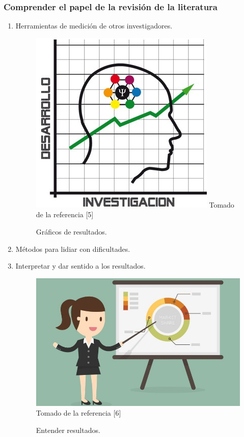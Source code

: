 \documentclass{beamer}
\newcounter{sauvegardeenumi}
\newcommand{\asuivre}{\setcounter{sauvegardeenumi}{\theenumi}}
\newcommand{\suite}{\setcounter{enumi}{\thesauvegardeenumi}}
\begin{document}
     \begin{frame}
        \frametitle{Comprender el papel de la revisi\'on de la literatura} 
        \begin{multicols}{2}
            \begin{enumerate}
                \suite
                \item Herramientas de medici\'on de otros investigadores.
                \begin{figure}
                    \includegraphics[scale=0.50]{figures/medicion}
                    \newline
                    {\tiny Tomado de la referencia [5] }
                    \caption{Gr\'aficos de resultados. }
                \end{figure}

                \item M\'etodos para lidiar con dificultades.
                \item Interpretar y dar sentido a los resultados.
                    \begin{figure}
                        \includegraphics[scale=0.70]{figures/resultsOriented}
                        \newline
                        {\tiny Tomado de la referencia [6] }
                        \caption{Entender resultados.}
                    \end{figure}
                    \asuivre
            \end{enumerate}
        \end{multicols}
    \end{frame}
\end{document}
